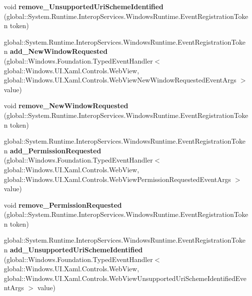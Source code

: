 \begin{DoxyCompactItemize}
void {\bfseries remove\+\_\+\+Unsupported\+Uri\+Scheme\+Identified} (global\+::\+System.\+Runtime.\+Interop\+Services.\+Windows\+Runtime.\+Event\+Registration\+Token token)
\item 
\mbox{\label{interface_windows_1_1_u_i_1_1_xaml_1_1_controls_1_1_i_web_view4_a31260436a1ad23171cfab6d9aa36d4d0}} 
global\+::\+System.\+Runtime.\+Interop\+Services.\+Windows\+Runtime.\+Event\+Registration\+Token {\bfseries add\+\_\+\+New\+Window\+Requested} (global\+::\+Windows.\+Foundation.\+Typed\+Event\+Handler$<$ global\+::\+Windows.\+U\+I.\+Xaml.\+Controls.\+Web\+View, global\+::\+Windows.\+U\+I.\+Xaml.\+Controls.\+Web\+View\+New\+Window\+Requested\+Event\+Args $>$ value)
\item 
\mbox{\label{interface_windows_1_1_u_i_1_1_xaml_1_1_controls_1_1_i_web_view4_a06f4976e0ae89feefa9ca60a799e7301}} 
void {\bfseries remove\+\_\+\+New\+Window\+Requested} (global\+::\+System.\+Runtime.\+Interop\+Services.\+Windows\+Runtime.\+Event\+Registration\+Token token)
\item 
\mbox{\label{interface_windows_1_1_u_i_1_1_xaml_1_1_controls_1_1_i_web_view4_adc0957ca3dc33612444167bf57005531}} 
global\+::\+System.\+Runtime.\+Interop\+Services.\+Windows\+Runtime.\+Event\+Registration\+Token {\bfseries add\+\_\+\+Permission\+Requested} (global\+::\+Windows.\+Foundation.\+Typed\+Event\+Handler$<$ global\+::\+Windows.\+U\+I.\+Xaml.\+Controls.\+Web\+View, global\+::\+Windows.\+U\+I.\+Xaml.\+Controls.\+Web\+View\+Permission\+Requested\+Event\+Args $>$ value)
\item 
\mbox{\label{interface_windows_1_1_u_i_1_1_xaml_1_1_controls_1_1_i_web_view4_a991ecf7ea74a7ba6b4e0df9150bd903e}} 
void {\bfseries remove\+\_\+\+Permission\+Requested} (global\+::\+System.\+Runtime.\+Interop\+Services.\+Windows\+Runtime.\+Event\+Registration\+Token token)
\item 
\mbox{\label{interface_windows_1_1_u_i_1_1_xaml_1_1_controls_1_1_i_web_view4_a6e70ca803e5cf51c343058bd94efe3cb}} 
global\+::\+System.\+Runtime.\+Interop\+Services.\+Windows\+Runtime.\+Event\+Registration\+Token {\bfseries add\+\_\+\+Unsupported\+Uri\+Scheme\+Identified} (global\+::\+Windows.\+Foundation.\+Typed\+Event\+Handler$<$ global\+::\+Windows.\+U\+I.\+Xaml.\+Controls.\+Web\+View, global\+::\+Windows.\+U\+I.\+Xaml.\+Controls.\+Web\+View\+Unsupported\+Uri\+Scheme\+Identified\+Event\+Args $>$ value)

\end{DoxyCompactItemize}
